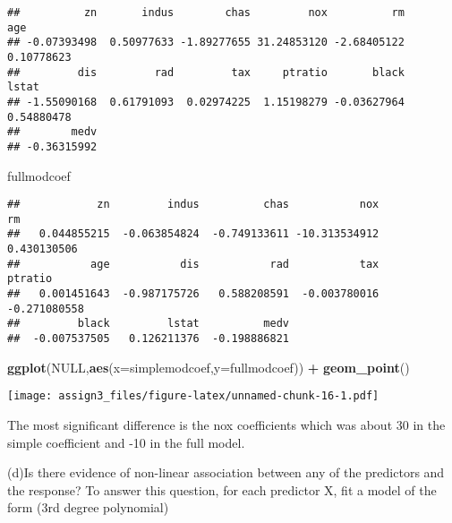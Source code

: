 \documentclass[]{article}
\newenvironment{Shaded}{\begin{snugshade}}{\end{snugshade}}
\newcommand{\DataTypeTok}[1]{\textcolor[rgb]{0.13,0.29,0.53}{#1}}
\newcommand{\KeywordTok}[1]{\textcolor[rgb]{0.13,0.29,0.53}{\textbf{#1}}}
\newcommand{\NormalTok}[1]{#1}
\newcommand{\OperatorTok}[1]{\textcolor[rgb]{0.81,0.36,0.00}{\textbf{#1}}}
\newcommand{\OtherTok}[1]{\textcolor[rgb]{0.56,0.35,0.01}{#1}}
\newcommand{\StringTok}[1]{\textcolor[rgb]{0.31,0.60,0.02}{#1}}
\begin{document}
\begin{verbatim}
##          zn       indus        chas         nox          rm         age 
## -0.07393498  0.50977633 -1.89277655 31.24853120 -2.68405122  0.10778623 
##         dis         rad         tax     ptratio       black       lstat 
## -1.55090168  0.61791093  0.02974225  1.15198279 -0.03627964  0.54880478 
##        medv 
## -0.36315992
\end{verbatim}

\begin{Shaded}
\begin{Highlighting}[]
\NormalTok{fullmodcoef}
\end{Highlighting}
\end{Shaded}

\begin{verbatim}
##            zn         indus          chas           nox            rm 
##   0.044855215  -0.063854824  -0.749133611 -10.313534912   0.430130506 
##           age           dis           rad           tax       ptratio 
##   0.001451643  -0.987175726   0.588208591  -0.003780016  -0.271080558 
##         black         lstat          medv 
##  -0.007537505   0.126211376  -0.198886821
\end{verbatim}

\begin{Shaded}
\begin{Highlighting}[]
\KeywordTok{ggplot}\NormalTok{(}\OtherTok{NULL}\NormalTok{,}\KeywordTok{aes}\NormalTok{(}\DataTypeTok{x=}\NormalTok{simplemodcoef,}\DataTypeTok{y=}\NormalTok{fullmodcoef)) }\OperatorTok{+}\StringTok{ }\KeywordTok{geom_point}\NormalTok{()}
\end{Highlighting}
\end{Shaded}

\texttt{[image: assign3\_files/figure-latex/unnamed-chunk-16-1.pdf]}

The most significant difference is the nox coefficients which was about
30 in the simple coefficient and -10 in the full model.

(d)Is there evidence of non-linear association between any of the
predictors and the response? To answer this question, for each predictor
X, fit a model of the form (3rd degree polynomial)
\end{document}
